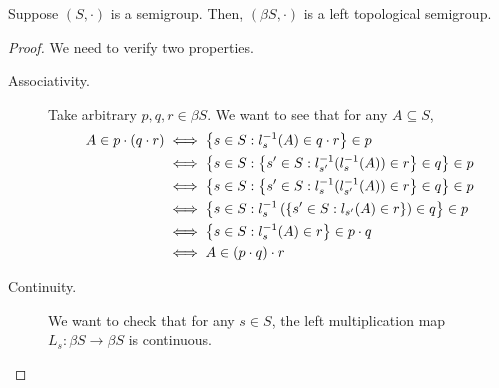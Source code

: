 \documentclass[11pt,letterpaper]{article}
\begin{document}
\begin{prop}
    Suppose $(S, \cdot)$ is a semigroup. Then, $(\beta S, \cdot)$ is a left
    topological semigroup.
\end{prop}

\begin{proof}
    We need to verify two properties.

    \begin{description}
        \item[Associativity.]
            Take arbitrary $p, q, r \in \beta S$.
            We want to see that for any $A \subseteq S$,
            \begin{align*}
                A \in p \cdot (q \cdot r)
                & \iff
                \left\{
                    s \in S :
                    l_s^{-1} (A) \in q \cdot r
                \right\}
                \in p \\
                & \iff
                \left\{
                    s \in S :
                    \left\{
                        s^\prime \in S :
                        l_{s^\prime}^{-1} ( l_s^{-1} (A) )
                        \in r
                    \right\}
                    \in q
                \right\}
                \in p \\
                & \iff
                \left\{
                    s \in S :
                    \left\{
                        s^\prime \in S :
                        l_s^{-1} ( l_{s^\prime}^{-1} (A) )
                        \in r
                    \right\}
                    \in q
                \right\}
                \in p \\
                & \iff
                \left\{
                    s \in S :
                    l_s^{-1} \left(
                        \left\{
                            s^\prime \in S :
                            l_{s^\prime} (A)
                            \in r
                        \right\}
                    \right)
                    \in q
                \right\}
                \in p \\
                & \iff
                \left\{
                    s \in S :
                    l_s^{-1} (A) \in r
                \right\}
                \in p \cdot q \\
                & \iff
                A \in (p \cdot q) \cdot r
            \end{align*}

        \item[Continuity.]
            We want to check that for any $s \in S$, the left multiplication
            map $L_s : \beta S \to \beta S$ is continuous.


\end{description}
\end{proof}
\end{document}
